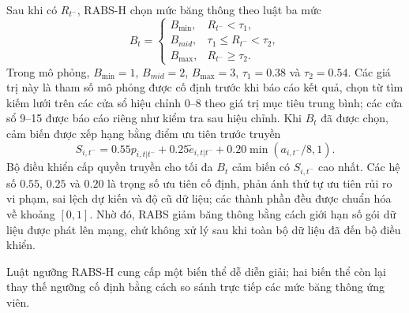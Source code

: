 \documentclass[10pt]{article}
\begin{document}
Sau khi có $R_{t^-}$, RABS-H chọn mức băng thông theo luật ba mức
\begin{equation}
B_t =
\begin{cases}
B_{\min}, & R_{t^-} < \tau_1,\\
B_{mid}, & \tau_1 \le R_{t^-} < \tau_2,\\
B_{\max}, & R_{t^-} \ge \tau_2.
\end{cases}
\end{equation}
Trong mô phỏng, $B_{\min}=1$, $B_{mid}=2$, $B_{\max}=3$, $\tau_1=0.38$ và $\tau_2=0.54$. Các giá trị này là tham số mô phỏng được cố định trước khi báo cáo kết quả, chọn từ tìm kiếm lưới trên các cửa sổ hiệu chỉnh 0--8 theo giá trị mục tiêu trung bình; các cửa sổ 9--15 được báo cáo riêng như kiểm tra sau hiệu chỉnh. Khi $B_t$ đã được chọn, cảm biến được xếp hạng bằng điểm ưu tiên trước truyền
\begin{equation}
S_{i,t^-}=0.55p_{i,t|t^-}+0.25\tilde e_{i,t|t^-}+0.20\min(a_{i,t^-}/8,1).
\end{equation}
Bộ điều khiển cấp quyền truyền cho tối đa $B_t$ cảm biến có $S_{i,t^-}$ cao nhất. Các hệ số $0.55$, $0.25$ và $0.20$ là trọng số ưu tiên cố định, phản ánh thứ tự ưu tiên rủi ro vi phạm, sai lệch dự kiến và độ cũ dữ liệu; các thành phần đều được chuẩn hóa về khoảng $[0,1]$. Nhờ đó, RABS giảm băng thông bằng cách giới hạn số gói dữ liệu được phát lên mạng, chứ không xử lý sau khi toàn bộ dữ liệu đã đến bộ điều khiển.

Luật ngưỡng RABS-H cung cấp một biến thể dễ diễn giải; hai biến thể còn lại thay thế ngưỡng cố định bằng cách so sánh trực tiếp các mức băng thông ứng viên.
\end{document}
